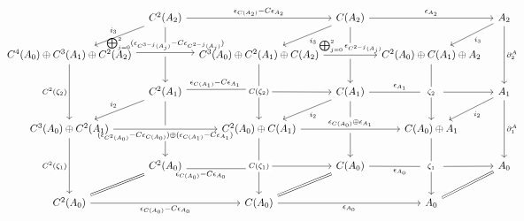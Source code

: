 \[\hspace{-70pt}\begin{tikzcd}[column sep=8pt]
	& {C^2(A_2)} && {C(A_2)} && {A_2} \\
	{C^4(A_0)\oplus C^3(A_1)\oplus C^2(A_2)} && {C^3(A_0)\oplus C^2(A_1)\oplus C(A_2)} && {C^2(A_0)\oplus C(A_1)\oplus A_2} \\
	& {C^2(A_1)} && {C(A_1)} && {A_1} \\
	{C^3(A_0)\oplus C^2(A_1)} && {C^2(A_0)\oplus C(A_1)} && {C(A_0)\oplus A_1} \\
	& {C^2(A_0)} && {C(A_0)} && {A_0} \\
	{C^2(A_0)} && {C(A_0)} && {A_0}
	\arrow["{\partial_1^A}", from=3-6, to=5-6]
	\arrow["{\partial_2^A}", from=1-6, to=3-6]
	\arrow["{\epsilon_{C(A_0)}-C\epsilon_{A_0}}"', from=6-1, to=6-3]
	\arrow["{\epsilon_{A_0}}"', from=6-3, to=6-5]
	\arrow[Rightarrow, no head, from=5-6, to=6-5]
	\arrow[""{name=0, anchor=center, inner sep=0}, "{\zeta_1}"{description}, from=4-5, to=6-5]
	\arrow["{i_2}", from=3-6, to=4-5]
	\arrow["{i_3}", from=1-6, to=2-5]
	\arrow[""{name=1, anchor=center, inner sep=0}, "{\zeta_2}"{description}, from=2-5, to=4-5]
	\arrow["{\epsilon_{A_2}}", from=1-4, to=1-6]
	\arrow["{\epsilon_{C(A_2)}-C\epsilon_{A_2}}", from=1-2, to=1-4]
	\arrow[""{name=2, anchor=center, inner sep=0}, "{C(\zeta_1)}"{description}, from=4-3, to=6-3]
	\arrow[""{name=3, anchor=center, inner sep=0}, "{(\epsilon_{C^2(A_0)}-C\epsilon_{C(A_0)})\oplus (\epsilon_{C(A_1)}-C\epsilon_{A_1})}"', from=4-1, to=4-3]
	\arrow[""{name=4, anchor=center, inner sep=0}, "{\epsilon_{C(A_0)}\oplus \epsilon_{A_1}}", from=4-3, to=4-5]
	\arrow[""{name=5, anchor=center, inner sep=0}, "{\bigoplus_{j=0}^2\epsilon_{C^{2-j}(A_j)}}", from=2-3, to=2-5]
	\arrow[""{name=6, anchor=center, inner sep=0}, "{\bigoplus_{j=0}^2(\epsilon_{C^{3-j}(A_j)}-C\epsilon_{C^{2-j}(A_j)})}", shift left, from=2-1, to=2-3]
	\arrow["{C^2(\zeta_2)}"', from=2-1, to=4-1]
	\arrow[""{name=7, anchor=center, inner sep=0}, "{C(\zeta_2)}"{description}, from=2-3, to=4-3]
	\arrow["{i_2}", from=3-4, to=4-3]
	\arrow["{i_2}"', from=3-2, to=4-1]
	\arrow["{i_3}"', from=1-2, to=2-1]
	\arrow["{i_3}", from=1-4, to=2-3]
	\arrow[Rightarrow, no head, from=5-4, to=6-3]
	\arrow[Rightarrow, no head, from=5-2, to=6-1]
	\arrow["{C^2(\zeta_1)}"', from=4-1, to=6-1]
	\arrow[shorten >=11pt, no head, from=1-4, to=5]
	\arrow[shorten <=3pt, from=5, to=3-4]
	\arrow[shorten >=9pt, no head, from=1-2, to=6]
	\arrow["{\epsilon_{A_1}}", shorten >=10pt, no head, from=3-4, to=1]
	\arrow[shorten <=11pt, from=1, to=3-6]
	\arrow["{\epsilon_{A_0}}"', shorten >=10pt, no head, from=5-4, to=0]
	\arrow[shorten <=11pt, from=0, to=5-6]
	\arrow[shorten <=3pt, from=6, to=3-2]
	\arrow["{\epsilon_{C(A_1)}-C\epsilon_{A_1}}"{pos=0.4}, shift left, shorten >=12pt, no head, from=3-2, to=7]
	\arrow[shorten <=12pt, from=7, to=3-4]
	\arrow[shorten <=3pt, from=4, to=5-4]
	\arrow["{\epsilon_{C(A_0)}-C\epsilon_{A_0}}"'{pos=0.2}, shift right, shorten >=12pt, no head, from=5-2, to=2]
	\arrow[shorten <=12pt, from=2, to=5-4]
	\arrow[shorten >=3pt, no head, from=3-2, to=3]
	\arrow[shorten <=11pt, from=3, to=5-2]
	\arrow[shorten >=11pt, no head, from=3-4, to=4]
\end{tikzcd}\]
